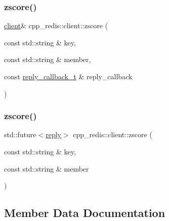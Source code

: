 \mbox{\label{classcpp__redis_1_1client_a5e0a18243dee60595c82fc4a630f6d86}} 
\subsubsection{\texorpdfstring{zscore()}{zscore()}\hspace{0.1cm}{\footnotesize\ttfamily [1/2]}}
{\footnotesize\ttfamily \hyperlink{classcpp__redis_1_1client}{client}\& cpp\+\_\+redis\+::client\+::zscore (\begin{DoxyParamCaption}\item[{const std\+::string \&}]{key,  }\item[{const std\+::string \&}]{member,  }\item[{const \hyperlink{classcpp__redis_1_1client_a061a1140d36d2eaeda82b09a0bb3f9f2}{reply\+\_\+callback\+\_\+t} \&}]{reply\+\_\+callback }\end{DoxyParamCaption})}

\mbox{\label{classcpp__redis_1_1client_a72b20e861696db3e4dd5a4af96a1b427}} 
\subsubsection{\texorpdfstring{zscore()}{zscore()}\hspace{0.1cm}{\footnotesize\ttfamily [2/2]}}
{\footnotesize\ttfamily std\+::future$<$\hyperlink{classcpp__redis_1_1reply}{reply}$>$ cpp\+\_\+redis\+::client\+::zscore (\begin{DoxyParamCaption}\item[{const std\+::string \&}]{key,  }\item[{const std\+::string \&}]{member }\end{DoxyParamCaption})}



\subsection{Member Data Documentation}
\mbox{\label{classcpp__redis_1_1client_ade039dd0ae2e1e6d1aa3c1c0e6f6fedd}} 

